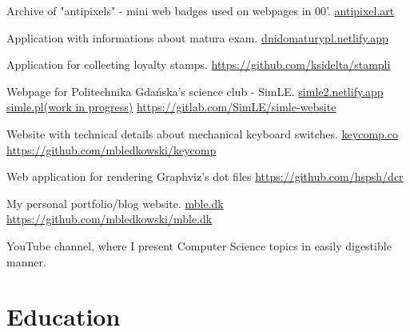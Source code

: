\documentclass[11pt, a4paper, sans, colorlinks]{moderncv}
\begin{document}
{Archive of "antipixels" - mini web badges used on webpages in 00'. \href{https://antipixel.art}{antipixel.art}}

{Application with informations about matura exam. \href{https://dnidomaturypl.netlify.app}{dnidomaturypl.netlify.app}}

{Application for collecting loyalty stamps. \href{https://github.com/ksidelta/stampli}{https://github.com/ksidelta/stampli}}

{Webpage for Politechnika Gdańska's science club - SimLE. \href{https://simle2.netlify.app}{simle2.netlify.app} \href{https://simle.pl}{simle.pl(work in progress)} \href{https://gitlab.com/SimLE/simle-website}{https://gitlab.com/SimLE/simle-website}}

{Website with technical details about mechanical keyboard switches. \href{https://keycomp.co}{keycomp.co} \href{https://github.com/mbledkowski/keycomp}{https://github.com/mbledkowski/keycomp}}

{Web application for rendering Graphviz's dot files \href{https://github.com/hspsh/dcr}{https://github.com/hspsh/dcr}}

{My personal portfolio/blog website. \href{https://mble.dk}{mble.dk} \href{https://github.com/mbledkowski/mble.dk}{https://github.com/mbledkowski/mble.dk}}

{YouTube channel, where I present Computer Science topics in easily digestible manner.}

\pagebreak

\section{Education}
\end{document}
